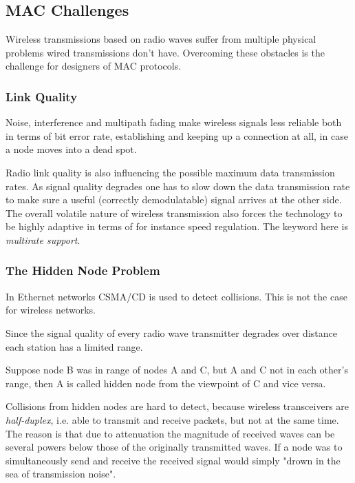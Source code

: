\documentclass{article}
\begin{document}
	\subsection{MAC Challenges}
	
	Wireless transmissions based on radio waves suffer from multiple physical problems wired transmissions don't have. Overcoming these obstacles is the challenge for designers of MAC protocols.
	
	\subsubsection{Link Quality}
	
	Noise, interference and multipath fading make wireless signals less reliable both in terms of bit error rate, establishing and keeping up a connection at all, in case a node moves into a dead spot. 
	
	\medskip
	
	Radio link quality is also influencing the possible maximum data transmission rates. As signal quality degrades one has to slow down the data transmission rate to make sure a useful (correctly demodulatable) signal arrives at the other side. The overall volatile nature of wireless transmission also forces the technology to be highly adaptive in terms of for instance speed regulation. The keyword here is \emph{multirate support}.
	
	\subsubsection{The Hidden Node Problem}
	
	In Ethernet networks CSMA/CD is used to detect collisions. This is not the case for wireless networks.
	
	\bigskip
	
	Since the signal quality of every radio wave transmitter degrades over distance each station has a limited range.

	\bigskip

	Suppose node B was in range of nodes A and C, but A and C not in each other's range, then A is called hidden node from the viewpoint of C and vice versa.
	
	\bigskip
	
	Collisions from hidden nodes are hard to detect, because wireless transceivers are \emph{half-duplex}, i.e. able to transmit and receive packets, but not at the same time. The reason is that due to attenuation the magnitude of received waves can be several powers below those of the originally transmitted waves. If a node was to simultaneously send and receive the received signal would simply "drown in the sea of transmission noise". 
	
\end{document}
